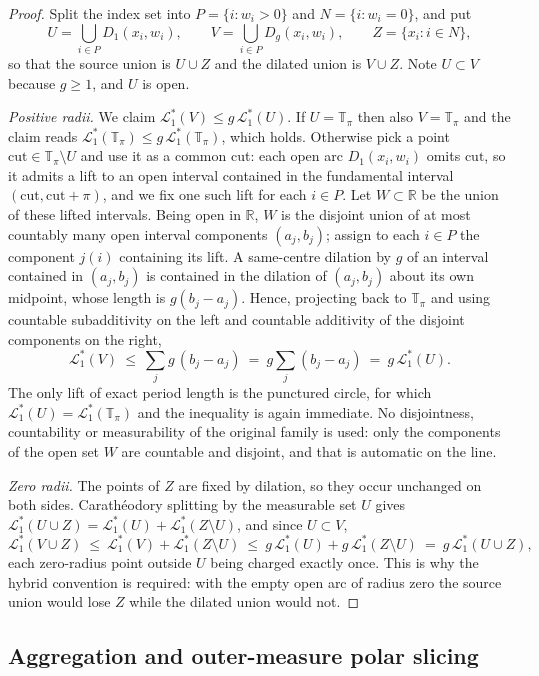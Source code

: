 \documentclass[11pt]{article}
\theoremstyle{plain}
\theoremstyle{definition}
\theoremstyle{remark}
\newcommand{\R}{\mathbb{R}}
\newcommand{\Tp}{\mathbb{T}_{\pi}}
\newcommand{\Lone}{\mathcal{L}^{*}_{1}}
\begin{document}
\begin{proof}
Split the index set into $P=\{i:w_{i}>0\}$ and $N=\{i:w_{i}=0\}$, and put
\[
  U=\bigcup_{i\in P}D_{1}(x_{i},w_{i}),\qquad
  V=\bigcup_{i\in P}D_{g}(x_{i},w_{i}),\qquad
  Z=\{x_{i}:i\in N\},
\]
so that the source union is $U\cup Z$ and the dilated union is $V\cup Z$. Note
$U\subset V$ because $g\ge1$, and $U$ is open.

\emph{Positive radii.} We claim $\Lone(V)\le g\,\Lone(U)$. If $U=\Tp$ then also
$V=\Tp$ and the claim reads $\Lone(\Tp)\le g\,\Lone(\Tp)$, which holds. Otherwise
pick a point $\mathrm{cut}\in\Tp\setminus U$ and use it as a common cut: each
open arc $D_{1}(x_{i},w_{i})$ omits $\mathrm{cut}$, so it admits a lift to an
open interval contained in the fundamental interval
$(\mathrm{cut},\mathrm{cut}+\pi)$, and we fix one such lift for each $i\in P$.
Let $W\subset\R$ be the union of these lifted intervals. Being open in $\R$, $W$
is the disjoint union of at most countably many open interval components
$(a_{j},b_{j})$; assign to each $i\in P$ the component $j(i)$ containing its
lift. A same-centre dilation by $g$ of an interval contained in $(a_{j},b_{j})$
is contained in the dilation of $(a_{j},b_{j})$ about its own midpoint, whose
length is $g(b_{j}-a_{j})$. Hence, projecting back to $\Tp$ and using countable
subadditivity on the left and countable additivity of the disjoint components on
the right,
\[
  \Lone(V)\ \le\ \sum_{j}g\,(b_{j}-a_{j})
  \ =\ g\sum_{j}(b_{j}-a_{j})\ =\ g\,\Lone(U).
\]
The only lift of exact period length is the punctured circle, for which
$\Lone(U)=\Lone(\Tp)$ and the inequality is again immediate. No disjointness,
countability or measurability of the original family is used: only the
components of the open set $W$ are countable and disjoint, and that is automatic
on the line.

\emph{Zero radii.} The points of $Z$ are fixed by dilation, so they occur
unchanged on both sides. Carath\'eodory splitting by the measurable set $U$
gives $\Lone(U\cup Z)=\Lone(U)+\Lone(Z\setminus U)$, and since $U\subset V$,
\[
  \Lone(V\cup Z)\ \le\ \Lone(V)+\Lone(Z\setminus U)
  \ \le\ g\,\Lone(U)+g\,\Lone(Z\setminus U)
  \ =\ g\,\Lone(U\cup Z),
\]
each zero-radius point outside $U$ being charged exactly once. This is why the
hybrid convention is required: with the empty open arc of radius zero the source
union would lose $Z$ while the dilated union would not.
\end{proof}

\subsection{Aggregation and outer-measure polar slicing}
\end{document}
